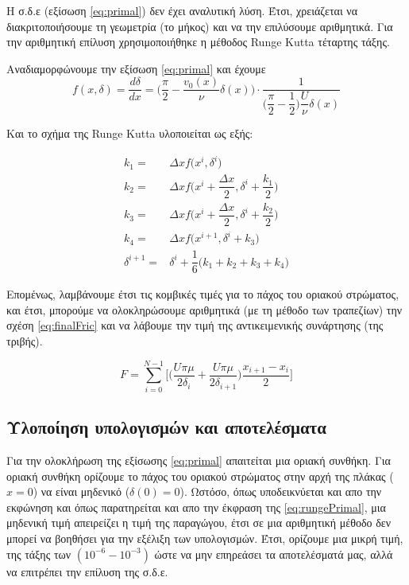 Η σ.δ.ε (εξίσωση \ref{eq:primal}) δεν έχει αναλυτική λύση. Έτσι, χρειάζεται να διακριτοποιήσουμε τη γεωμετρία (το μήκος) και να την επιλύσουμε αριθμητικά. Για την αριθμητική επίλυση χρησιμοποιήθηκε η μέθοδος Runge Kutta τέταρτης τάξης.

Αναδιαμορφώνουμε την εξίσωση \ref{eq:primal} και έχουμε
\begin{equation}
    f(x,\delta) = \dfrac{d\delta}{dx} =  \Big( \dfrac{\pi}{2} - \dfrac{v_0(x)}{\nu}\delta(x)\Big) \cdot \dfrac{1}{\big(\dfrac{\pi}{2}-\dfrac{1}{2}\big)\dfrac{U}{\nu}\delta(x)}
\label{eq:rungePrimal}
\end{equation}

Και το σχήμα της Runge Kutta υλοποιείται ως εξής:

\begin{equation}
    \begin{aligned}
        k_1 =& \Delta x f\big(x^i, \delta^i\big)\\[3pt]
        k_2 =& \Delta x f\Big(x^i + \dfrac{\Delta x}{2}, \delta^i + \dfrac{k_1}{2}\Big)\\[3pt]
        k_3 =& \Delta x f\Big(x^i + \dfrac{\Delta x}{2}, \delta^i + \dfrac{k_2}{2}\Big)\\[5pt]
        k_4 =& \Delta x f\big(x^{i+1} , \delta^i + k_3\big)\\[12pt]
        \delta^{i+1} =& \delta^i + \dfrac{1}{6}\big(k_1+k_2+k_3+k_4\big)
    \end{aligned}
\end{equation}

Επομένως, λαμβάνουμε έτσι τις κομβικές τιμές για το πάχος του οριακού στρώματος, και έτσι, μπορούμε να ολοκληρώσουμε αριθμητικά (με τη μέθοδο των τραπεζίων) την σχέση \ref{eq:finalFric} και να λάβουμε την τιμή της αντικειμενικής συνάρτησης (της τριβής).

\begin{equation}
    F = \sum_{i=0}^{N-1}\Bigg[\Big(\dfrac{U\pi\mu}{2\delta_i}+\dfrac{U\pi\mu}{2\delta_{i+1}}\Big)\dfrac{x_{i+1}-x_i}{2}\Bigg]
\label{eq:trapzFric}
\end{equation}

\subsection{Υλοποίηση υπολογισμών και αποτελέσματα}

Για την ολοκλήρωση της εξίσωσης \ref{eq:primal} απαιτείται μια οριακή συνθήκη. Για οριακή συνθήκη ορίζουμε το πάχος του οριακού στρώματος στην αρχή της πλάκας ($x=0$) να είναι μηδενικό ($\delta(0)=0$). Ωστόσο, όπως υποδεικνύεται και απο την εκφώνηση και όπως παρατηρείται και απο την έκφραση της \ref{eq:rungePrimal}, μια μηδενική τιμή απειρείζει η τιμή της παραγώγου, έτσι σε μια αριθμητική μέθοδο δεν μπορεί να βοηθήσει για την εξέλιξη των υπολογισμών. Έτσι, ορίζουμε μια μικρή τιμή, της τάξης των $(10^{-6}-10^{-3})$ ώστε να μην επηρεάσει τα αποτελέσματά μας, αλλά να επιτρέπει την επίλυση της σ.δ.ε. 

